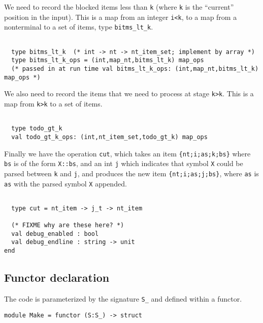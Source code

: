 \documentclass[]{article}
\begin{document}
\begin{multicols}{2}
We need to record the blocked items less than \texttt{k} (where
\texttt{k} is the ``current'' position in the input). This is a map from
an integer \texttt{i\textless{}k}, to a map from a nonterminal to a set
of items, type \texttt{bitms\_lt\_k}.

\begin{verbatim}

  type bitms_lt_k  (* int -> nt -> nt_item_set; implement by array *)
  type bitms_lt_k_ops = (int,map_nt,bitms_lt_k) map_ops
  (* passed in at run time val bitms_lt_k_ops: (int,map_nt,bitms_lt_k) map_ops *)

\end{verbatim}

We also need to record the items that we need to process at stage
\texttt{k\textquotesingle{}\textgreater{}k}. This is a map from
\texttt{k\textquotesingle{}\textgreater{}k} to a set of items.

\begin{verbatim}

  type todo_gt_k
  val todo_gt_k_ops: (int,nt_item_set,todo_gt_k) map_ops

\end{verbatim}

Finally we have the operation \texttt{cut}, which takes an item
\texttt{\{nt;i;as;k;bs\}} where \texttt{bs} is of the form
\texttt{X::bs\textquotesingle{}}, and an int \texttt{j} which indicates
that symbol \texttt{X} could be parsed between \texttt{k} and
\texttt{j}, and produces the new item
\texttt{\{nt;i;as\textquotesingle{};j;bs\textquotesingle{}\}}, where
\texttt{as\textquotesingle{}} is \texttt{as} with the parsed symbol
\texttt{X} appended.

\begin{verbatim}

  type cut = nt_item -> j_t -> nt_item

  (* FIXME why are these here? *)
  val debug_enabled : bool
  val debug_endline : string -> unit
end

\end{verbatim}

\subsection{Functor declaration}

The code is parameterized by the signature \texttt{S\_} and defined
within a functor.

\begin{verbatim}
module Make = functor (S:S_) -> struct
\end{verbatim}


\end{multicols}
\end{document}
